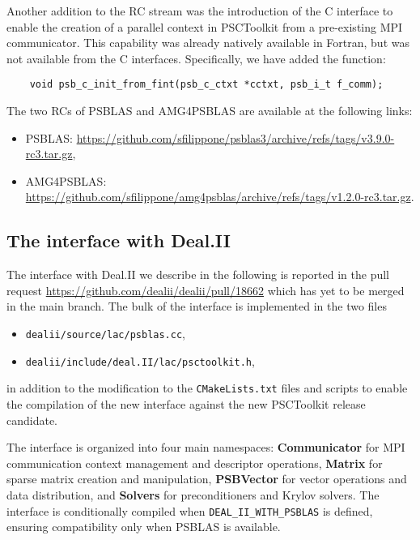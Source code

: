 \documentclass[a4paper,12pt]{article}
\begin{document}
Another addition to the RC stream was the introduction of the C interface to enable the creation of a parallel context 
in PSCToolkit from a pre-existing MPI communicator. This capability was already natively available in Fortran, 
but was not available from the C interfaces. Specifically, we have added the function:
\begin{verbatim}
    void psb_c_init_from_fint(psb_c_ctxt *cctxt, psb_i_t f_comm);
\end{verbatim}

The two RCs of PSBLAS and AMG4PSBLAS are available at the following links:
\begin{itemize}
    \item PSBLAS: \url{https://github.com/sfilippone/psblas3/archive/refs/tags/v3.9.0-rc3.tar.gz},
    \item AMG4PSBLAS: \url{https://github.com/sfilippone/amg4psblas/archive/refs/tags/v1.2.0-rc3.tar.gz}.
\end{itemize}

\subsection{The interface with Deal.II}

The interface with Deal.II we describe in the following is reported in the pull request
\url{https://github.com/dealii/dealii/pull/18662} which has yet to be merged in the main branch.
The bulk of the interface is implemented in the two files
\begin{itemize}
    \item \texttt{dealii/source/lac/psblas.cc},
    \item \texttt{dealii/include/deal.II/lac/psctoolkit.h},
\end{itemize}
in addition to the modification to the \texttt{CMakeLists.txt} files and scripts to enable the 
compilation of the new interface against the new PSCToolkit release candidate.

The interface is organized into four main namespaces: \textbf{Communicator} for MPI communication 
context management and descriptor operations, \textbf{Matrix} for sparse matrix creation and manipulation, 
\textbf{PSBVector} for vector operations and data distribution, and \textbf{Solvers} for preconditioners 
and Krylov solvers. The interface is conditionally compiled when \texttt{DEAL\_II\_WITH\_PSBLAS} 
is defined, ensuring compatibility only when PSBLAS is available.
\end{document}

